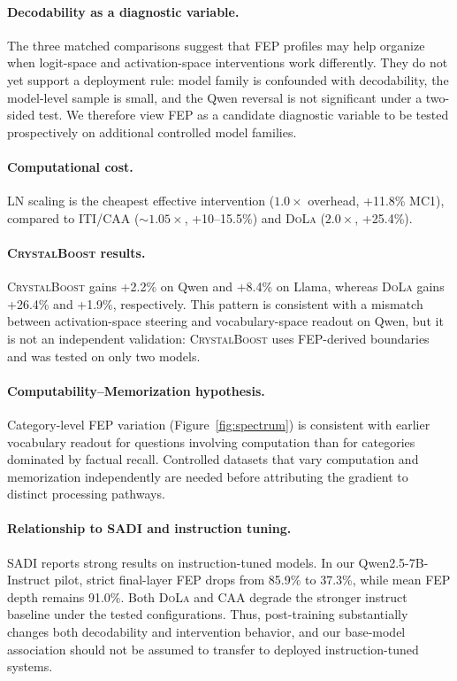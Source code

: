 \documentclass[11pt]{article}
\newcommand{\iti}{\textsc{ITI}}
\newcommand{\dola}{\textsc{DoLa}}
\newcommand{\crystalboost}{\textsc{CrystalBoost}}
\newcommand{\caa}{\textsc{CAA}}
\begin{document}
\paragraph{Decodability as a diagnostic variable.} The three matched comparisons suggest that FEP profiles may help organize when logit-space and activation-space interventions work differently. They do not yet support a deployment rule: model family is confounded with decodability, the model-level sample is small, and the Qwen reversal is not significant under a two-sided test. We therefore view FEP as a candidate diagnostic variable to be tested prospectively on additional controlled model families.

\paragraph{Computational cost.} LN scaling is the cheapest effective intervention ($1.0\times$ overhead, +11.8\% MC1), compared to \iti{}/\caa{} (${\sim}1.05\times$, +10--15.5\%) and \dola{} ($2.0\times$, +25.4\%).

\paragraph{\crystalboost{} results.} \crystalboost{} gains +2.2\% on Qwen and +8.4\% on Llama, whereas \dola{} gains +26.4\% and +1.9\%, respectively. This pattern is consistent with a mismatch between activation-space steering and vocabulary-space readout on Qwen, but it is not an independent validation: \crystalboost{} uses FEP-derived boundaries and was tested on only two models.

\paragraph{Computability--Memorization hypothesis.} Category-level FEP variation (Figure~\ref{fig:spectrum}) is consistent with earlier vocabulary readout for questions involving computation than for categories dominated by factual recall. Controlled datasets that vary computation and memorization independently are needed before attributing the gradient to distinct processing pathways.

\paragraph{Relationship to SADI and instruction tuning.} SADI \citep{zhang2025sadi} reports strong results on instruction-tuned models. In our Qwen2.5-7B-Instruct pilot, strict final-layer FEP drops from 85.9\% to 37.3\%, while mean FEP depth remains 91.0\%. Both \dola{} and \caa{} degrade the stronger instruct baseline under the tested configurations. Thus, post-training substantially changes both decodability and intervention behavior, and our base-model association should not be assumed to transfer to deployed instruction-tuned systems.
\end{document}
